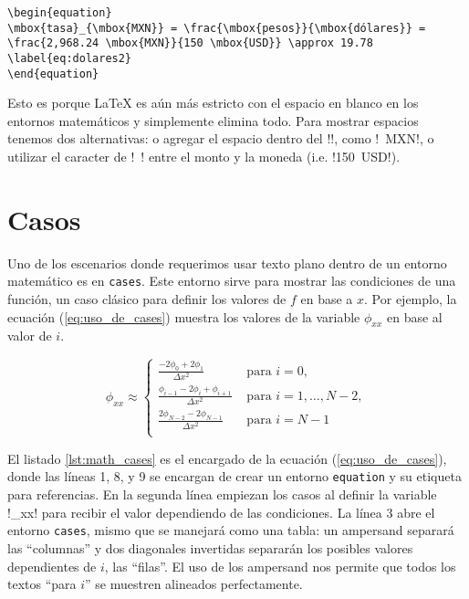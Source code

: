 \begin{lstlisting}[style=latex,caption={Código con texto usando \texttt{\textbackslash{}mbox}.},label=lst:entorno_equation2]
\begin{equation}
\mbox{tasa}_{\mbox{MXN}} = \frac{\mbox{pesos}}{\mbox{dólares}} = \frac{2,968.24 \mbox{MXN}}{150 \mbox{USD}} \approx 19.78
\label{eq:dolares2}
\end{equation}
\end{lstlisting}

Esto es porque \LaTeX{} es aún más estricto con el espacio en blanco en los entornos matemáticos y simplemente elimina todo. Para mostrar espacios tenemos dos alternativas: o agregar el espacio dentro del !\mbox!, como !\mbox{ MXN}!, o utilizar el caracter de !~! entre el monto y la moneda (i.e. !150~\mbox{USD}!).



\section{Casos}
\label{sec:casos}



Uno de los escenarios donde requerimos usar texto plano dentro de un entorno matemático es en \texttt{cases}. Este entorno sirve para mostrar las condiciones de una función, un caso clásico para definir los valores de $f$ en base a $x$. Por ejemplo, la ecuación (\ref{eq:uso_de_cases}) muestra los valores de la variable $\phi_{xx}$ en base al valor de $i$.

\begin{equation}
\phi_{xx} \approx
\begin{cases}
	\displaystyle \frac{-2 \phi_{0} + 2\phi_{1}}{\Delta x^2}  &  \mbox{ para } i = 0, \\
	\displaystyle \frac{\phi_{i-1} - 2 \phi_{i} + \phi_{i+1}}{\Delta x^2}  &  \mbox{ para } i = 1, \ldots, N - 2, \\
	\displaystyle \frac{2\phi_{N-2} - 2 \phi_{N-1}}{\Delta x^2}  &  \mbox{ para } i = N - 1 \\
\end{cases}
\label{eq:uso_de_cases}
\end{equation}

El listado \ref{lst:math_cases} es el encargado de la ecuación (\ref{eq:uso_de_cases}), donde las líneas 1, 8, y 9 se encargan de crear un entorno \texttt{equation} y su etiqueta para referencias. En la segunda línea empiezan los casos al definir la variable !\phi_{xx}! para recibir el valor dependiendo de las condiciones. La línea 3 abre el entorno \texttt{cases}, mismo que se manejará como una tabla: un ampersand separará las ``columnas'' y dos diagonales invertidas separarán los posibles valores dependientes de $i$, las ``filas''. El uso de los ampersand nos permite que todos los textos ``para $i$'' se muestren alineados perfectamente.

